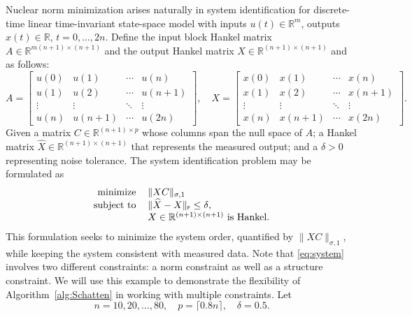 \documentclass[11pt,reqno]{amsart}
\newcommand{\st}{\sigma}
\newcommand{\F}{{\scriptscriptstyle\mathsf{F}}}
\theoremstyle{definition}
\numberwithin{equation}{section}
\newcommand{\R}{\mathbb{R}}
\begin{document}
Nuclear norm minimization arises naturally in system identification \cite{system,system2} for discrete-time linear time-invariant state-space model with inputs $u(t) \in \R^m$, outputs $x(t) \in \R$, $t = 0, \dots, 2n$. Define the input block Hankel matrix $A \in \R^{m(n+1) \times (n+1)}$ and the output Hankel matrix $X \in \R^{(n+1) \times (n+1)}$ and as follows:
\[
A = \begin{bmatrix}
    u(0) &u(1) &\cdots &u(n)\\
    u(1) &u(2) &\cdots &u(n+1)\\
    \vdots &\vdots &\ddots &\vdots\\
    u(n) &u(n+1) &\cdots &u(2n)
\end{bmatrix},
\quad 
X = \begin{bmatrix}
    x(0) &x(1) &\cdots &x(n)\\
    x(1) &x(2) &\cdots &x(n+1)\\
    \vdots &\vdots &\ddots &\vdots\\
    x(n) &x(n+1) &\cdots &x(2n)
\end{bmatrix}.
\]
Given a matrix $C \in \R^{(n+1) \times p}$ whose columns span the null space of $A$; a Hankel matrix $\widehat{X} \in \R^{(n+1) \times (n+1)}$ that represents the measured output; and a $\delta > 0$ representing noise tolerance. The system identification problem may be formulated as
\begin{equation}\label{eq:system}
\begin{tabular}{rl}
minimize  &  $\lVert XC \rVert_{\st,1}$ \\
subject to &   $\lVert \widehat{X} - X \rVert_\F \le \delta$, \\
&  $X \in \mathbb{R}^{(n+1) \times (n+1)}$ is Hankel.
\end{tabular}
\end{equation}
This formulation seeks to minimize the system order, quantified by $\lVert XC \rVert_{\st,1}$, while keeping the system consistent with measured data. Note that \eqref{eq:system} involves two different constraints: a norm constraint as well as a structure constraint. We will use this example to demonstrate the flexibility of Algorithm~\ref{alg:Schatten} in working with multiple constraints. Let
\[
n = 10, 20, \dots, 80, \quad p = \lceil 0.8n \rceil, \quad \delta = 0.5.
\]
\end{document}

